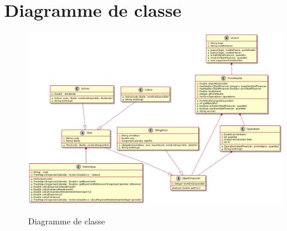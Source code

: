 \section{Diagramme de classe}

\begin{figure}[H]
  \center
  \includegraphics[scale=0.25]{../graph/DiagrammeClasseFinalModele.png} \\
  \caption{Diagramme de classe}
\end{figure}
